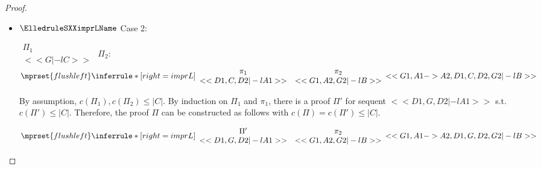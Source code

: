 \begin{proof}
\begin{enumerate}
\begin{itemize}
  \item $\ElledruleSXXimprLName$ Case 2:
      \begin{center}
        \scriptsize
        \begin{math}
          \begin{array}{c}
            \Pi_1 \\
            {<<G |-l C>>}
          \end{array}
        \end{math}
        \qquad\qquad
        $\Pi_2$:
        \begin{math}
          $$\mprset{flushleft}
          \inferrule* [right={\tiny imprL}] {
            {
              \begin{array}{cc}
                \pi_1 & \pi_2 \\
                {<<D1, C, D2 |-l A1>>} & {<<G1, A2, G2 |-l B>>}
              \end{array}
            }
          }{<<G1, A1 -> A2, D1, C, D2, G2 |-l B>>}
        \end{math}
      \end{center}
      By assumption, $c(\Pi_1),c(\Pi_2)\leq |C|$. By induction on $\Pi_1$ and $\pi_1$, there is
      a proof $\Pi'$ for sequent $<<D1, G, D2 |-l A1>>$ s.t. $c(\Pi') \leq |C|$. Therefore, the
      proof $\Pi$ can be constructed as follows with $c(\Pi) = c(\Pi') \leq |C|$.
      \begin{center}
        \scriptsize
        \begin{math}
          $$\mprset{flushleft}
          \inferrule* [right={\tiny imprL}] {
            {
              \begin{array}{cc}
                \Pi' & \pi_2 \\
                {<<D1, G, D2 |-l A1>>} & {<<G1, A2, G2 |-l B>>}
              \end{array}
            }
          }{<<G1, A1 -> A2, D1, G, D2, G2 |-l B>>}
        \end{math}
      \end{center}


\end{itemize}
\end{enumerate}
\end{proof}
